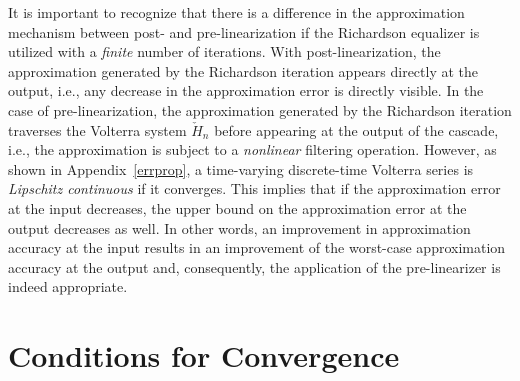 \documentclass[10pt,twocolumn,twoside]{IEEEtran}
\begin{document}
It is important to recognize that there is a difference in the approximation
mechanism between post- and pre-linearization if the Richardson equalizer
is utilized with a \emph{finite} number of iterations. With post-linearization, the
approximation generated by the Richardson iteration appears directly at the
output, i.e., any decrease in the approximation error is directly visible.
In the case of pre-linearization, the approximation generated by the Richardson
iteration traverses the Volterra system $\check{H}_n$ before appearing at the output
of the cascade, i.e., the approximation is subject to a \emph{nonlinear} filtering
operation. However, as shown in Appendix~\ref{errprop}, a time-varying discrete-time
Volterra series is \emph{Lipschitz continuous} if it converges.
This implies that if the approximation error at the input decreases, the upper
bound on the approximation error at the output decreases as well. In other words,
an improvement in approximation accuracy at the input results in an improvement of
the worst-case approximation accuracy at the output and, consequently, the
application of the pre-linearizer is indeed appropriate.


\section{Conditions for Convergence}
	\label{conv}
\end{document}

